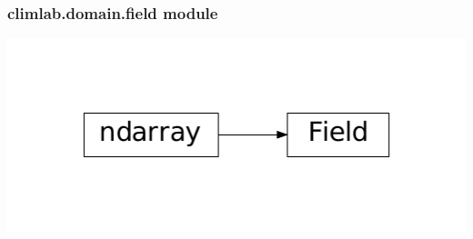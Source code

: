 \documentclass[a4paper,10pt,english]{sphinxmanual}
\begin{document}
\subsubsection{climlab.domain.field module}
\label{api/climlab.domain:climlab-domain-field-module}
\includegraphics{inheritance-9225d93949bc5965881cf6ea2a8da4734f3c8f65.pdf}
\label{api/climlab.domain:module-climlab.domain.field}
\end{document}
